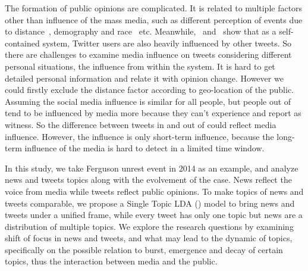 The formation of public opinions are complicated. It is related to multiple factors other than influence of the mass media, such as different perception of events due to distance~\cite{he2015uncovering}, demography and race~\cite{page1987moves} etc. Meanwhile,~ and~ show that as a self-contained system, Twitter users are also heavily influenced by other tweets. So there are challenges to examine media influence on tweets considering different personal situations, the influence from within the system. It is hard to get detailed personal information and relate it with opinion change. However we could firstly exclude the distance factor according to geo-location of the public. Assuming the social media influence is similar for all people, but people out of \stlouis tend to be influenced by media more because they can't experience and report as witness. So the difference between tweets in and out of \stlouis could reflect media influence. However, the influence is only short-term influence, because the long-term influence of the media is hard to detect in a limited time window. 

In this study, we take Ferguson unrest event in 2014 as an example, and analyze news and tweets topics along with the evolvement of the case. News reflect the voice from media while tweets reflect public opinions. To make topics of news and tweets comparable, we propose a Single Topic LDA (\stlda) model to bring news and tweets under a unified frame, while every tweet has only one topic but news are a distribution of multiple topics. We explore the research questions by examining shift of focus in news and tweets, and what may lead to the dynamic of topics, specifically on the possible relation to burst, emergence and decay of certain topics, thus the interaction between media and the public.

